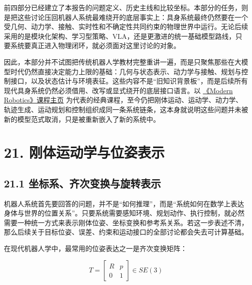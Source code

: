 

前四部分已经建立了本报告的问题定义、历史主线和比较坐标。本部分的任务，则是把这些讨论压回机器人系统最难绕开的底层事实上：具身系统最终仍然要在一个受几何、动力学、接触、实时性和不确定性共同约束的物理世界中运行。无论后续采用的是模块化架构、学习型策略、VLA，还是更激进的统一基础模型路线，只要系统要真正进入物理闭环，就必须面对这里讨论的对象。

因此，本部分并不试图把传统机器人学教材完整重讲一遍，而是只聚焦那些在大模型时代仍然直接决定能力上限的基础：几何与状态表示、动力学与接触、规划与控制接口，以及状态估计与环境表征。这些内容不是“旧知识背景板”，而是后续所有现代具身系统仍然必须借用、改写或显式绕开的底层接口语言。以 \href{https://modernrobotics.org/}{《Modern Robotics》课程主页} 为代表的经典课程，至今仍把刚体运动、运动学、动力学、轨迹生成、运动规划和控制组织成同一条系统链条，这本身就说明这些问题并未被新的模型范式取消，只是被重新嵌入了新的系统中。

\section*{21. 刚体运动学与位姿表示}

\subsection*{21.1 坐标系、齐次变换与旋转表示}


机器人系统首先要回答的问题，并不是“如何推理”，而是“系统如何在数学上表达身体与世界的位置关系”。只要系统需要感知环境、规划动作、执行控制，就必然需要一种统一方式来表示刚体位姿、坐标变换和参考系关系。若这一步表述不清，那么后续关于目标位姿、误差、约束和运动接口的全部讨论都会失去可计算基础。

在现代机器人学中，最常用的位姿表达之一是齐次变换矩阵：

\begingroup
\footnotesize
\begin{equation*}
T =
\begin{bmatrix}
R & p \\
0 & 1
\end{bmatrix}
\in SE(3)
\end{equation*}
\endgroup

